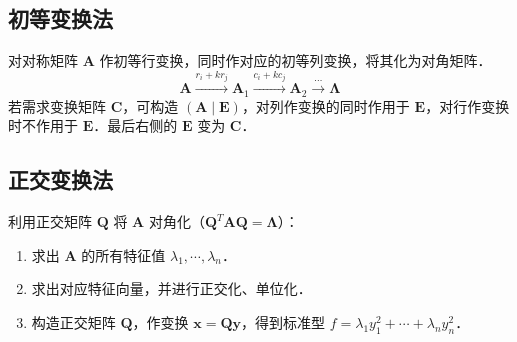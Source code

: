 \documentclass[12pt, a4paper, oneside, UTF8]{ctexbook}
\begin{document}
\subsection{初等变换法}

对对称矩阵 $\bm{A}$ 作初等行变换，同时作对应的初等列变换，将其化为对角矩阵．
\[ \bm{A} \xrightarrow{r_i + k r_j} \bm{A}_1 \xrightarrow{c_i + k c_j} \bm{A}_2 \xrightarrow{\cdots} \bm{\Lambda} \]
若需求变换矩阵 $\bm{C}$，可构造 $(\bm{A} \mid \bm{E})$，对列作变换的同时作用于 $\bm{E}$，对行作变换时不作用于 $\bm{E}$．最后右侧的 $\bm{E}$ 变为 $\bm{C}$．

\subsection{正交变换法}

利用正交矩阵 $\bm{Q}$ 将 $\bm{A}$ 对角化（$\bm{Q}^T \bm{A} \bm{Q} = \bm{\Lambda}$）：
\begin{enumerate}
    \item 求出 $\bm{A}$ 的所有特征值 $\lambda_1, \cdots, \lambda_n$．
    \item 求出对应特征向量，并进行正交化、单位化．
    \item 构造正交矩阵 $\bm{Q}$，作变换 $\bm{x} = \bm{Q}\bm{y}$，得到标准型 $f = \lambda_1 y_1^2 + \cdots + \lambda_n y_n^2$．
\end{enumerate}
\end{document}
